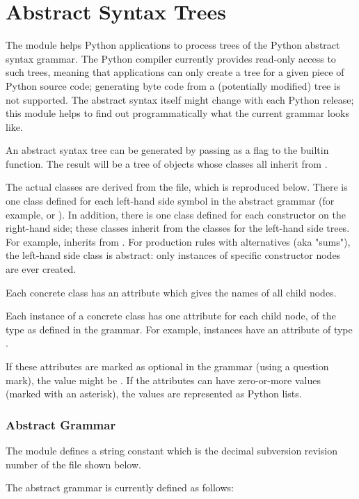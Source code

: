 \chapter{Abstract Syntax Trees\label{ast}}



The  module helps Python applications to process
trees of the Python abstract syntax grammar. The Python compiler
currently provides read-only access to such trees, meaning that
applications can only create a tree for a given piece of Python
source code; generating byte code from a (potentially modified)
tree is not supported. The abstract syntax itself might change with
each Python release; this module helps to find out programmatically
what the current grammar looks like.

An abstract syntax tree can be generated by passing 
as a flag to the  builtin function. The result will be a tree
of objects whose classes all inherit from .

The actual classes are derived from the  file,
which is reproduced below. There is one class defined for each left-hand
side symbol in the abstract grammar (for example,  or ).
In addition, there is one class defined for each constructor on the
right-hand side; these classes inherit from the classes for the left-hand
side trees. For example,  inherits from .
For production rules with alternatives (aka "sums"), the left-hand side
class is abstract: only instances of specific constructor nodes are ever
created.

Each concrete class has an attribute  which gives the
names of all child nodes.

Each instance of a concrete class has one attribute for each child node,
of the type as defined in the grammar. For example, 
instances have an attribute  of type .

If these attributes are marked as optional in the grammar (using a
question mark), the value might be . If the attributes
can have zero-or-more values (marked with an asterisk), the
values are represented as Python lists.

\subsection{Abstract Grammar}

The module defines a string constant  which
is the decimal subversion revision number of the file shown below.

The abstract grammar is currently defined as follows:

